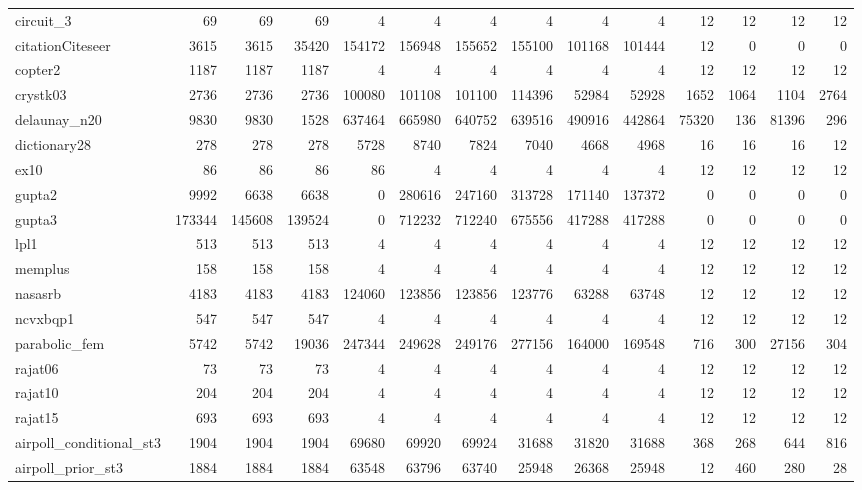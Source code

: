 \begin{sidewaystable}
{\begin{tabular}{ l r r r r r r r r r r r r r }
      circuit\_3 & 69 & 69 & 69 & 4 & 4 & 4 & 4 & 4 & 4 & 12 & 12 & 12 & 12 \\
      citationCiteseer & 3615 & 3615 & 35420 & 154172 & 156948 & 155652 & 155100 & 101168 & 101444 & 12 & 0 & 0 & 0 \\
      copter2 & 1187 & 1187 & 1187 & 4 & 4 & 4 & 4 & 4 & 4 & 12 & 12 & 12 & 12 \\
      crystk03 & 2736 & 2736 & 2736 & 100080 & 101108 & 101100 & 114396 & 52984 & 52928 & 1652 & 1064 & 1104 & 2764 \\
      delaunay\_n20 & 9830 & 9830 & 1528 & 637464 & 665980 & 640752 & 639516 & 490916 & 442864 & 75320 & 136 & 81396 & 296 \\
      dictionary28 & 278 & 278 & 278 & 5728 & 8740 & 7824 & 7040 & 4668 & 4968 & 16 & 16 & 16 & 12 \\
      ex10 & 86 & 86 & 86 & 86 & 4 & 4 & 4 & 4 & 4 & 12 & 12 & 12 & 12 \\
      gupta2 & 9992 & 6638 & 6638 & 0 & 280616 & 247160 & 313728 & 171140 & 137372 & 0 & 0 & 0 & 0 \\
      gupta3 & 173344 & 145608 & 139524 & 0 & 712232 & 712240 & 675556 & 417288 & 417288 & 0 & 0 & 0 & 0 \\
      lpl1 & 513 & 513 & 513 & 4 & 4 & 4 & 4 & 4 & 4 & 12 & 12 & 12 & 12 \\
      memplus & 158 & 158 & 158 & 4 & 4 & 4 & 4 & 4 & 4 & 12 & 12 & 12 & 12 \\
      nasasrb & 4183 & 4183 & 4183 & 124060 & 123856 & 123856 & 123776 & 63288 & 63748 & 12 & 12 & 12 & 12 \\
      ncvxbqp1 & 547 & 547 & 547 & 4 & 4 & 4 & 4 & 4 & 4 & 12 & 12 & 12 & 12 \\
      parabolic\_fem & 5742 & 5742 & 19036 & 247344 & 249628 & 249176 & 277156 & 164000 & 169548 & 716 & 300 & 27156 & 304 \\
      rajat06 & 73 & 73 & 73 & 4 & 4 & 4 & 4 & 4 & 4 & 12 & 12 & 12 & 12 \\
      rajat10 & 204 & 204 & 204 & 4 & 4 & 4 & 4 & 4 & 4 & 12 & 12 & 12 & 12 \\
      rajat15 & 693 & 693 & 693 & 4 & 4 & 4 & 4 & 4 & 4 & 12 & 12 & 12 & 12 \\
      airpoll\_conditional\_st3 & 1904 & 1904 & 1904 & 69680 & 69920 & 69924 & 31688 & 31820 & 31688 & 368 & 268 & 644 & 816 \\
      airpoll\_prior\_st3 & 1884 & 1884 & 1884 & 63548 & 63796 & 63740 & 25948 & 26368 & 25948 & 12 & 460 & 280 & 28 \\

\end{tabular}}
\end{sidewaystable}
